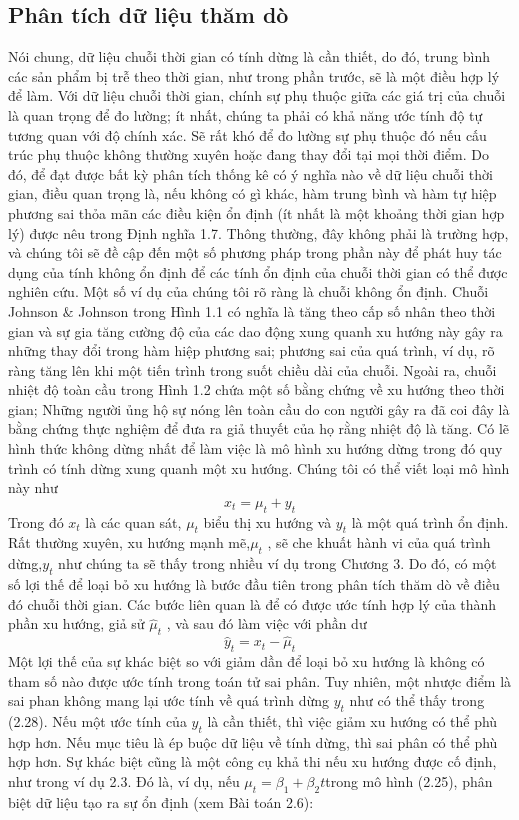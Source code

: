 \documentclass[12pt, a4paper,oneside]{book}
\theoremstyle{definition}
\begin{document}
\subsection{Phân tích dữ liệu thăm dò}
Nói chung, dữ liệu chuỗi thời gian có tính dừng là cần thiết, do đó, trung bình các sản phẩm bị trễ theo thời gian, như trong phần trước, sẽ là một điều hợp lý để làm. Với dữ liệu chuỗi thời gian, chính sự phụ thuộc giữa các giá trị của chuỗi là quan trọng để đo lường; ít nhất, chúng ta phải có khả năng ước tính độ tự tương quan với độ chính xác. Sẽ rất khó để đo lường sự phụ thuộc đó nếu cấu trúc phụ thuộc không thường xuyên hoặc đang thay đổi tại mọi thời điểm.
Do đó, để đạt được bất kỳ phân tích thống kê có ý nghĩa nào về dữ liệu chuỗi thời gian, điều quan trọng là, nếu không có gì khác, hàm trung bình và hàm tự hiệp phương sai thỏa mãn các điều kiện ổn định (ít nhất là một khoảng thời gian hợp lý) được nêu trong Định nghĩa 1.7. Thông thường, đây không phải là trường hợp, và chúng tôi sẽ đề cập đến một số phương pháp trong phần này để phát huy tác dụng của tính không ổn định  để các tính ổn định của chuỗi thời gian có thể được nghiên cứu. 
Một số ví dụ của chúng tôi rõ ràng là chuỗi không ổn định. Chuỗi Johnson $ \& $ Johnson trong Hình 1.1 có nghĩa là tăng theo cấp số nhân theo thời gian và sự gia tăng cường độ của các dao động xung quanh xu hướng này gây ra những thay đổi trong hàm hiệp phương sai; phương sai của quá trình, ví dụ, rõ ràng tăng lên khi một tiến trình trong suốt chiều dài của chuỗi. Ngoài ra, chuỗi nhiệt độ toàn cầu trong Hình 1.2 chứa một số bằng chứng về xu hướng theo thời gian; Những người ủng hộ sự nóng lên toàn cầu do con người gây ra đã coi đây là bằng chứng thực nghiệm để đưa ra giả thuyết của họ rằng nhiệt độ là tăng. 
Có lẽ hình thức không dừng nhất để làm việc là mô hình xu hướng dừng trong đó quy trình có tính dừng xung quanh một xu hướng. Chúng tôi có thể viết loại mô hình này như
$$ x_{t}=\mu_{t}+y_{t} $$
Trong đó $ x_{t} $ là các quan sát, $ \mu_{t} $ biểu thị xu hướng và $ y_{t} $ là một quá trình ổn định. Rất thường xuyên, xu hướng mạnh mẽ,$ \mu_{t} $ , sẽ che khuất hành vi của quá trình dừng,$ y_{t} $ như chúng ta sẽ thấy trong nhiều ví dụ trong Chương 3. Do đó, có một số lợi thế để loại bỏ xu hướng là bước đầu tiên trong phân tích thăm dò về điều đó chuỗi thời gian. Các bước liên quan là để có được ước tính hợp lý của thành phần xu hướng, giả sử $ \hat{\mu}_{t} $ , và sau đó làm việc với phần dư
$$ \hat{y}_{t}=x_{t}-\hat{\mu}_{t} $$
Một lợi thế của sự khác biệt so với giảm dần để loại bỏ xu hướng là không có tham số nào được ước tính trong toán tử sai phân. Tuy nhiên, một nhược điểm là sai phan không mang lại ước tính về quá trình dừng $y_{t}$ như có thể thấy trong (2.28). Nếu một ước tính của $ y_{t} $ là cần thiết, thì việc giảm xu hướng có thể phù hợp hơn. Nếu mục tiêu là ép buộc dữ liệu về tính dừng, thì sai phân có thể phù hợp hơn. Sự khác biệt cũng là một công cụ khả thi nếu xu hướng được cố định, như trong ví dụ 2.3. Đó là, ví dụ, nếu $ \mu_{t}=\beta_{1}+\beta_{2}t $trong mô hình (2.25), phân biệt dữ liệu tạo ra sự ổn định (xem Bài toán 2.6):
\end{document}
